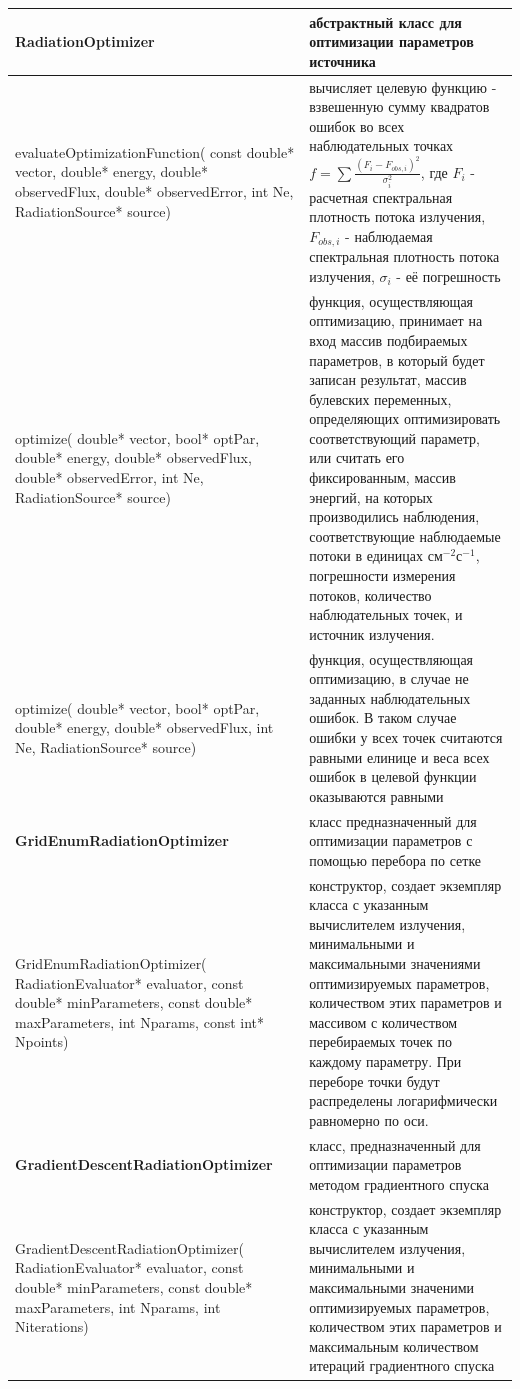 \begin{small}
	\label{RadiationOptimizerMethods}
	\begin{xtabular}{|p{0.41\textwidth}|p{0.59\textwidth}|}
		\hline
		\textbf{RadiationOptimizer} & абстрактный класс для оптимизации параметров источника \\
		\hline
		evaluateOptimizationFunction( const double* vector, double* energy, double* observedFlux, double* observedError, int Ne, RadiationSource* source) & вычисляет целевую функцию - взвешенную сумму квадратов ошибок во всех наблюдательных точках $f = \sum \frac{(F_i - F_{obs,i})^2}{\sigma_i^2}$, где $F_i$ - расчетная спектральная плотность потока излучения, $F_{obs,i}$ - наблюдаемая спектральная плотность потока излучения, $\sigma_i$ - её погрешность\\
		\hline
		optimize( double* vector, bool* optPar, double* energy, double* observedFlux, double* observedError, int Ne, RadiationSource* source) & функция, осуществляющая оптимизацию, принимает на вход массив подбираемых параметров, в который будет записан результат, массив булевских переменных, определяющих оптимизировать соответствующий параметр, или считать его фиксированным, массив энергий, на которых производились наблюдения, соответствующие наблюдаемые потоки в единицах $\text{см}^{-2}\text{с}^{-1}$, погрешности измерения потоков, количество наблюдательных точек, и источник излучения.\\
		\hline
		optimize( double* vector, bool* optPar, double* energy, double* observedFlux, int Ne, RadiationSource* source) & функция, осуществляющая оптимизацию, в случае не заданных наблюдательных ошибок. В таком случае ошибки у всех точек считаются равными елинице и веса всех ошибок в целевой функции оказываются равными\\
		\hline
		\textbf{GridEnumRadiationOptimizer} & класс предназначенный для оптимизации параметров с помощью перебора по сетке\\
		\hline
		GridEnumRadiationOptimizer( RadiationEvaluator* evaluator, const double* minParameters, const double* maxParameters, int Nparams, const int* Npoints) & конструктор, создает экземпляр класса с указанным вычислителем излучения, минимальными и максимальными значениями оптимизируемых параметров, количеством этих параметров и массивом с количеством перебираемых точек по каждому параметру. При переборе точки будут распределены логарифмически равномерно по оси.\\
		\hline
		\textbf{GradientDescentRadiationOptimizer} & класс, предназначенный для оптимизации параметров методом градиентного спуска\\
		\hline
		GradientDescentRadiationOptimizer( RadiationEvaluator* evaluator, const double* minParameters, const double* maxParameters, int Nparams, int Niterations) & конструктор, создает экземпляр класса с указанным вычислителем излучения, минимальными и максимальными значеними оптимизируемых параметров, количеством этих параметров и максимальным количеством итераций градиентного спуска\\
		\hline		
	\end{xtabular}
\end{small}

